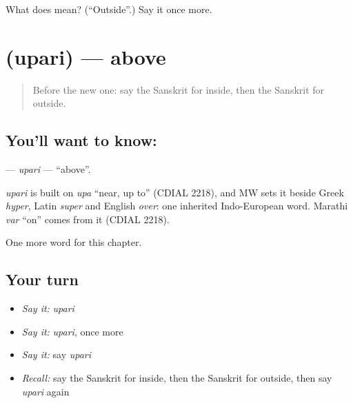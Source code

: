 \begin{tcolorbox}[breakable,colback=teal!4,colframe=teal!35!black,title={Before you move on}]
What does  mean? (\textquotedblleft{}Outside\textquotedblright{}.) Say it once more.
\end{tcolorbox}
\section[\texorpdfstring{\sk{उपरि} (upari)}{उपरि (upari)}]{ (upari) — above}

\label{lesson:SA-C94-upari}



\begin{quote}
Before the new one: say the Sanskrit for inside, then the Sanskrit for outside.
\end{quote}

\subsection*{You'll want to know: }
\textbf{} — \emph{upari} — \textquotedblleft{}above\textquotedblright{}.

\begin{cousinweb}
\emph{upari} is built on \emph{upa} \textquotedblleft{}near, up to\textquotedblright{} (CDIAL 2218), and MW sets it beside Greek \emph{hyper}, Latin \emph{super} and English \emph{over}: one inherited Indo-European word. Marathi \emph{var} \textquotedblleft{}on\textquotedblright{} comes from it (CDIAL 2218).
\end{cousinweb}

\begin{grammarlens}[title={What you've built}]
One more word for this chapter.
\end{grammarlens}

\subsection*{Your turn}
\begin{itemize}
\raggedright
  \item \emph{Say it:} \emph{upari}
  \item \emph{Say it:} \emph{upari}, once more
  \item \emph{Say it:} say \emph{upari}
  \item \emph{Recall:} say the Sanskrit for inside, then the Sanskrit for outside, then say \emph{upari} again
\end{itemize}

